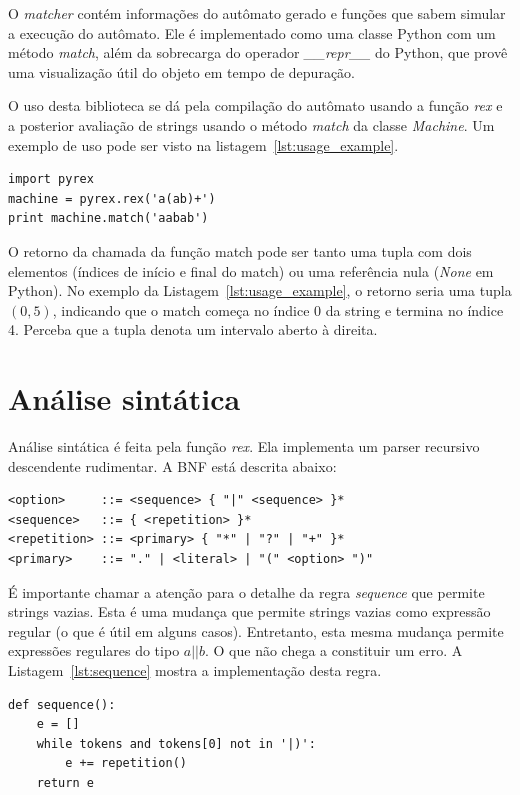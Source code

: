 \documentclass[a4paper,12pt,oneside,onecolumn]{uerj}
\begin{document}
O \emph{matcher} contém informações do autômato gerado e funções que sabem simular a execução do autômato. Ele é implementado como uma classe Python com um método \emph{match}, além da sobrecarga do operador \emph{\_\_repr\_\_} do Python, que provê uma visualização útil do objeto em tempo de depuração.

O uso desta biblioteca se dá pela compilação do autômato usando a função \emph{rex} e a posterior avaliação de strings usando o método \emph{match} da classe \emph{Machine}. Um exemplo de uso pode ser visto na listagem~\ref{lst:usage_example}.

\vspace{0.5cm}
\begin{lstlisting}[caption={Exemplo de uso da biblioteca PyRex},label=lst:usage_example]
import pyrex
machine = pyrex.rex('a(ab)+')
print machine.match('aabab')
\end{lstlisting}

O retorno da chamada da função match pode ser tanto uma tupla com dois elementos (índices de início e final do match) ou uma referência nula (\emph{None} em Python). No exemplo da Listagem~\ref{lst:usage_example}, o retorno seria uma tupla $(0, 5)$, indicando que o match começa no índice 0 da string e termina no índice 4. Perceba que a tupla denota um intervalo aberto à direita.

\section{Análise sintática}

Análise sintática é feita pela função \emph{rex}. Ela implementa um parser recursivo descendente rudimentar. A BNF está descrita abaixo:

\begin{verbatim}
<option>     ::= <sequence> { "|" <sequence> }*
<sequence>   ::= { <repetition> }*
<repetition> ::= <primary> { "*" | "?" | "+" }*
<primary>    ::= "." | <literal> | "(" <option> ")"
\end{verbatim}

É importante chamar a atenção para o detalhe da regra \emph{sequence} que permite strings vazias. Esta é uma mudança que permite strings vazias como expressão regular (o que é útil em alguns casos). Entretanto, esta mesma mudança permite expressões regulares do tipo $a||b$. O que não chega a constituir um erro. A Listagem~\ref{lst:sequence} mostra a implementação desta regra.

\vspace{0.5cm}
\begin{lstlisting}[caption={Implementação da regra \emph{sequence}},label=lst:sequence]
def sequence():
    e = []
    while tokens and tokens[0] not in '|)':
        e += repetition()
    return e
\end{lstlisting}
\end{document}

